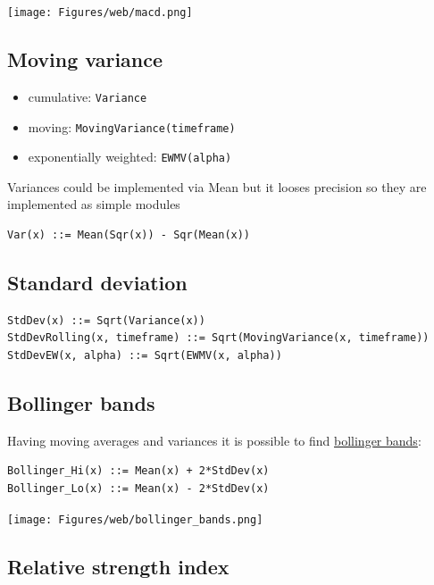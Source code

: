 \documentclass[a4paper,11pt]{article}
\begin{document}
\centerline{\texttt{[image: Figures/web/macd.png]}}

\subsection{Moving variance}\label{moving-variance}

\begin{itemize}
\itemsep1pt\parskip0pt
\item
  cumulative: \texttt{Variance}
\item
  moving: \texttt{MovingVariance(timeframe)}
\item
  exponentially weighted: \texttt{EWMV(alpha)}
\end{itemize}
Variances could be implemented via Mean but it looses precision so they
are implemented as simple modules

\begin{verbatim}
Var(x) ::= Mean(Sqr(x)) - Sqr(Mean(x))
\end{verbatim}

\subsection{Standard deviation}\label{standard-deviation}

\begin{verbatim}
StdDev(x) ::= Sqrt(Variance(x))
StdDevRolling(x, timeframe) ::= Sqrt(MovingVariance(x, timeframe))
StdDevEW(x, alpha) ::= Sqrt(EWMV(x, alpha))
\end{verbatim}

\subsection{Bollinger bands}\label{bollinger-bands}

Having moving averages and variances it is possible to find
\href{http://en.wikipedia.org/wiki/Bollinger_Bands}{bollinger bands}:

\begin{verbatim}
Bollinger_Hi(x) ::= Mean(x) + 2*StdDev(x)
Bollinger_Lo(x) ::= Mean(x) - 2*StdDev(x)
\end{verbatim}

\centerline{\texttt{[image: Figures/web/bollinger\_bands.png]}}

\subsection{Relative strength index}\label{relative-strength-index}
\end{document}
